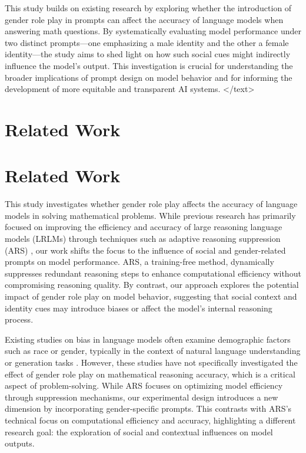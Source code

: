 \documentclass{article}
\begin{document}
This study builds on existing research by exploring whether the introduction of gender role play in prompts can affect the accuracy of language models when answering math questions. By systematically evaluating model performance under two distinct prompts—one emphasizing a male identity and the other a female identity—the study aims to shed light on how such social cues might indirectly influence the model's output. This investigation is crucial for understanding the broader implications of prompt design on model behavior and for informing the development of more equitable and transparent AI systems.
</text>
\section{Related Work}
\section*{Related Work}

This study investigates whether gender role play affects the accuracy of language models in solving mathematical problems. While previous research has primarily focused on improving the efficiency and accuracy of large reasoning language models (LRLMs) through techniques such as adaptive reasoning suppression (ARS) \cite{2510.00071v2}, our work shifts the focus to the influence of social and gender-related prompts on model performance. ARS, a training-free method, dynamically suppresses redundant reasoning steps to enhance computational efficiency without compromising reasoning quality. By contrast, our approach explores the potential impact of gender role play on model behavior, suggesting that social context and identity cues may introduce biases or affect the model's internal reasoning process. 

Existing studies on bias in language models often examine demographic factors such as race or gender, typically in the context of natural language understanding or generation tasks \cite{DBLP:journals/corr/abs-2205-06216}. However, these studies have not specifically investigated the effect of gender role play on mathematical reasoning accuracy, which is a critical aspect of problem-solving. While ARS focuses on optimizing model efficiency through suppression mechanisms, our experimental design introduces a new dimension by incorporating gender-specific prompts. This contrasts with ARS's technical focus on computational efficiency and accuracy, highlighting a different research goal: the exploration of social and contextual influences on model outputs. 
\end{document}

